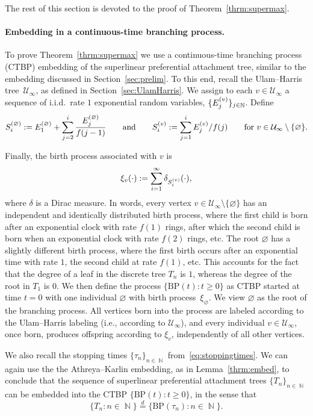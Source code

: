 \documentclass[11pt]{article}
\numberwithin{equation}{section}
\DeclareMathOperator{\N}{\mathbb{N}} %
\newcommand{\be}{\begin{equation}}
\newcommand{\ee}{\end{equation}}
\newcommand{\bp}{\mathrm{BP}}
\def\cU{{\mathcal U}}
\theoremstyle{definition}
\begin{document}
The rest of this section is devoted to the proof of Theorem~\ref{thrm:supermax}. 

\paragraph{Embedding in a continuous-time branching process.}
To prove Theorem~\ref{thrm:supermax} we use a continuous-time branching process (CTBP) embedding of the superlinear preferential attachment tree, similar to the embedding discussed in Section~\ref{sec:prelim}. To this end, recall the Ulam--Harris tree~$\cU_\infty$, as defined in Section~\ref{sec:UlamHarris}. We assign to each $v\in \cU_\infty$ a sequence of i.i.d.\ rate $1$ exponential random variables, $\{E^{\scriptsize (v)}_j\}_{j\in\N}$. Define  
\be S^{\scriptsize(\varnothing)}_i:=E^{(\varnothing)}_1+\sum_{j=2}^i \frac{E^{(\varnothing)}_j}{f(j-1)}\qquad \text{and}\qquad  S^{\scriptsize (v)}_i:=\sum_{j=1}^{i}E_j^{(v)}/f(j)\qquad \text{for }v\in \cU_\infty\setminus\{\varnothing\}. 
\ee 

Finally, the birth process associated with $v$ is 
\be 
\xi_v(\cdot):=\sum_{i=1}^\infty \delta_{S^{\scriptsize (v)}_i}(\cdot),
\ee 
where $\delta$ is a Dirac measure. In words, every vertex $v\in \cU_\infty\setminus\{\varnothing\}$ has an independent and identically distributed birth process, where the first child is born after an exponential clock with rate $f(1)$ rings, after which the second child is born when an exponential clock with rate $f(2)$ rings, etc. The root $\varnothing$ has a slightly different birth process, where the first birth occurs after an exponential time with rate $1$, the second child at rate $f(1)$, etc. This accounts for the fact that the degree of a leaf  in the discrete tree $T_n$ is $1$, whereas the degree of the root in $T_1$ is $0$.  We then define the process $\{\text{BP}(t): t\geq 0\}$ as CTBP started at time $t=0$ with one individual $\varnothing$ with birth process~$\xi_\varnothing$. We view $\varnothing$ as the root of the branching process. All vertices born into the process are labeled according to the Ulam--Harris labeling (i.e., according to $\cU_\infty$), and every individual $v\in \cU_\infty$, once born, produces offspring according to $\xi_v$, independently of all other vertices.

We also recall the stopping times $\{\tau_n\}_{n\in\N}$ from~\eqref{eq:stoppingtimes}. We can again use the the Athreya--Karlin embedding, as in Lemma~\ref{thrm:embed}, to conclude that the sequence of superlinear preferential attachment trees $\{T_n\}_{n\in\N}$ can be embedded into the CTBP $\{\bp(t): t\geq 0 \}$, in the sense that
\be \label{eq:embedding}
\{T_n: n\in\N\}\overset d= \{\bp(\tau_n):n\in\N\}.
\ee 
\end{document}
